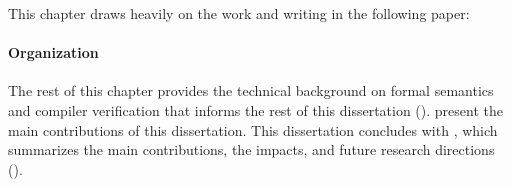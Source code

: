 This chapter draws heavily on the work and writing in the following paper:





\paragraph{Organization}

The rest of this chapter provides the technical background on formal semantics and compiler
verification that informs the rest of this dissertation ().
 present the main contributions of this
dissertation.  This dissertation concludes with , which summarizes the main
contributions, the impacts, and future research directions ().









